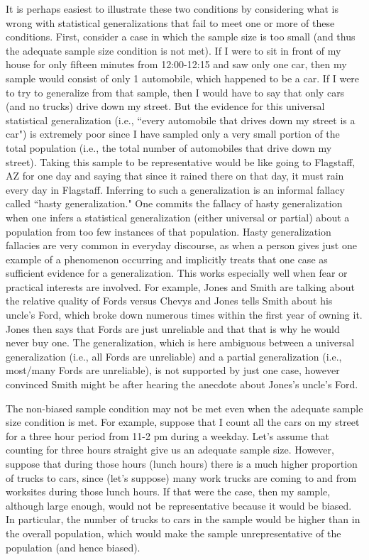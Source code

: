 It is perhaps easiest to illustrate these two conditions by considering what is
wrong with statistical generalizations that fail to meet one or more of these
conditions. First, consider a case in which the sample size is too small (and thus
the adequate sample size condition is not met). If I were to sit in front of my
house for only fifteen minutes from 12:00-12:15 and saw only one car, then my
sample would consist of only 1 automobile, which happened to be a car. If I
were to try to generalize from that sample, then I would have to say that only
cars (and no trucks) drive down my street. But the evidence for this universal
statistical generalization (i.e., ``every automobile that drives down my street is a
car") is extremely poor since I have sampled only a very small portion of the
total population (i.e., the total number of automobiles that drive down my
street). Taking this sample to be representative would be like going to Flagstaff,
AZ for one day and saying that since it rained there on that day, it must rain
every day in Flagstaff. Inferring to such a generalization is an informal fallacy
called ``hasty generalization." One commits the fallacy of hasty generalization
when one infers a statistical generalization (either universal or partial) about a
population from too few instances of that population. Hasty generalization
fallacies are very common in everyday discourse, as when a person gives just
one example of a phenomenon occurring and implicitly treats that one case as
sufficient evidence for a generalization. This works especially well when fear or
practical interests are involved. For example, Jones and Smith are talking about
the relative quality of Fords versus Chevys and Jones tells Smith about his
uncle's Ford, which broke down numerous times within the first year of owning
it. Jones then says that Fords are just unreliable and that that is why he would
never buy one. The generalization, which is here ambiguous between a
universal generalization (i.e., all Fords are unreliable) and a partial generalization
(i.e., most/many Fords are unreliable), is not supported by just one case,
however convinced Smith might be after hearing the anecdote about Jones's
uncle's Ford.

The non-biased sample condition may not be met even when the adequate
sample size condition is met. For example, suppose that I count all the cars on
my street for a three hour period from 11-2 pm during a weekday. Let's assume
that counting for three hours straight give us an adequate sample size.
However, suppose that during those hours (lunch hours) there is a much higher
proportion of trucks to cars, since (let's suppose) many work trucks are coming
to and from worksites during those lunch hours. If that were the case, then my
sample, although large enough, would not be representative because it would
be biased. In particular, the number of trucks to cars in the sample would be
higher than in the overall population, which would make the sample
unrepresentative of the population (and hence biased).

